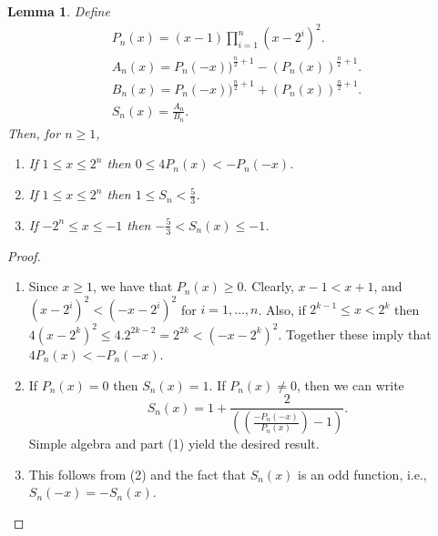 \documentclass{amsbook}
\newtheorem{lemma}[theorem]{Lemma}
\theoremstyle{definition}
\theoremstyle{remark}
\numberwithin{section}{chapter}
\numberwithin{equation}{chapter}
\begin{document}
\begin{lemma}\label{gaplfunctionsdefine}
Define
\[\begin{array}{c}
P_n(x) = (x-1)\prod_{i=1}^n(x-2^i)^2. \\
A_n(x)=P_n(-x))^{\frac{n}{2}+1}-(P_n(x))^{\frac{n}{2}+1}. \\
B_n(x)=P_n(-x))^{\frac{n}{2}+1}+(P_n(x))^{\frac{n}{2}+1}. \\
S_n(x)=\frac{A_n}{B_n}.
\end{array}\]
Then, for $n\geq 1$,
\begin{enumerate}
\item If $1\leq x\leq 2^n$ then $0\leq 4P_n(x)<-P_n(-x)$.
\item If $1\leq x\leq 2^n$ then $1\leq S_n<\frac{5}{3}$.
\item If $-2^n\leq x\leq -1$ then $-\frac{5}{3}<S_n(x)\leq -1$.
\end{enumerate}
\end{lemma}
\begin{proof}
\begin{enumerate}
\item Since $x\geq 1$, we have that $P_n(x)\geq 0$. Clearly, $x-1<x+1$, and $(x-2^i)^2<(-x-2^i)^2$ for $i=1,\ldots ,n$. Also, if $2^{k-1}\leq x<2^k$ then $4(x-2^k)^2\leq 4.2^{2k-2}=2^{2k}<(-x-2^k)^2$. Together these imply that $4P_n(x)<-P_n(-x)$.
\item If $P_n(x)=0$ then $S_n(x)=1$. If $P_n(x)\neq 0$, then we can write
\[
S_n(x)=1+\frac{2}{\left(\left(\frac{-P_n(-x)}{P_n(x)}\right)-1\right)}.
\]
Simple algebra and part (1) yield the desired result.
\item This follows from (2) and the fact that $S_n(x)$ is an odd function, i.e., $S_n(-x)=-S_n(x)$.
\end{enumerate}
\end{proof}
\end{document}
